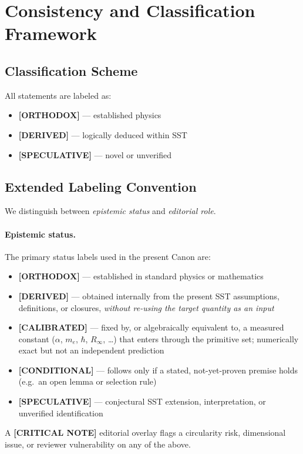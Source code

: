 \documentclass[11pt]{article}
\theoremstyle{definition}
\theoremstyle{plain}
\theoremstyle{remark}
\begin{document}
        
\section{Consistency and Classification Framework}
    \label{sec:consistency}
    
    \subsection{Classification Scheme}
        
        All statements are labeled as:
        
        \begin{itemize}
            \item \textbf{[ORTHODOX]} — established physics
            \item \textbf{[DERIVED]} — logically deduced within SST
            \item \textbf{[SPECULATIVE]} — novel or unverified
        \end{itemize}

    \subsection{Extended Labeling Convention}

        We distinguish between \emph{epistemic status} and \emph{editorial role}.

        \paragraph{Epistemic status.}
        The primary status labels used in the present Canon are:
        \begin{itemize}
            \item \textbf{[ORTHODOX]} --- established in standard physics or mathematics
            \item \textbf{[DERIVED]} --- obtained internally from the present SST assumptions, definitions, or closures, \emph{without re-using the target quantity as an input}
            \item \textbf{[CALIBRATED]} --- fixed by, or algebraically equivalent to, a measured constant ($\alpha$, $m_e$, $\hbar$, $R_\infty$, \dots) that enters through the primitive set; numerically exact but not an independent prediction
            \item \textbf{[CONDITIONAL]} --- follows only if a stated, not-yet-proven premise holds (e.g.\ an open lemma or selection rule)
            \item \textbf{[SPECULATIVE]} --- conjectural SST extension, interpretation, or unverified identification
        \end{itemize}
        A \textbf{[CRITICAL NOTE]} editorial overlay flags a circularity risk, dimensional issue, or reviewer vulnerability on any of the above.
\end{document}
